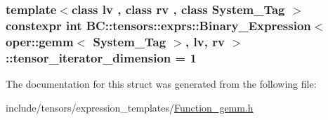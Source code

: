 \subsubsection[{\texorpdfstring{tensor\+\_\+iterator\+\_\+dimension}{tensor_iterator_dimension}}]{\setlength{\rightskip}{0pt plus 5cm}template$<$class lv , class rv , class System\+\_\+\+Tag $>$ constexpr int {\bf B\+C\+::tensors\+::exprs\+::\+Binary\+\_\+\+Expression}$<$ {\bf oper\+::gemm}$<$ System\+\_\+\+Tag $>$, lv, rv $>$\+::tensor\+\_\+iterator\+\_\+dimension = 1\hspace{0.3cm}{\ttfamily [static]}}\hypertarget{structBC_1_1tensors_1_1exprs_1_1Binary__Expression_3_01oper_1_1gemm_3_01System__Tag_01_4_00_01lv_00_01rv_01_4_a055ab0c4f9c5f19a5d7eeafdfa7119b3}{}\label{structBC_1_1tensors_1_1exprs_1_1Binary__Expression_3_01oper_1_1gemm_3_01System__Tag_01_4_00_01lv_00_01rv_01_4_a055ab0c4f9c5f19a5d7eeafdfa7119b3}


The documentation for this struct was generated from the following file\+:\begin{DoxyCompactItemize}
\item 
include/tensors/expression\+\_\+templates/\hyperlink{Function__gemm_8h}{Function\+\_\+gemm.\+h}\end{DoxyCompactItemize}
